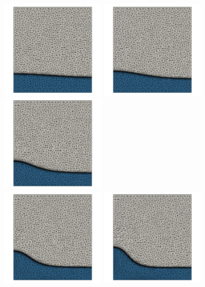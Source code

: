 \begin{center}
\includegraphics[width=5cm]{python_codes/fieldstone_93/results_exp4/gamma/mat000}
\includegraphics[width=5cm]{python_codes/fieldstone_93/results_exp4/gamma/mat099}
\includegraphics[width=5cm]{python_codes/fieldstone_93/results_exp4/gamma/mat199}\\
\includegraphics[width=5cm]{python_codes/fieldstone_93/results_exp4/gamma/mat299}
\includegraphics[width=5cm]{python_codes/fieldstone_93/results_exp4/gamma/mat399}

\end{center}
